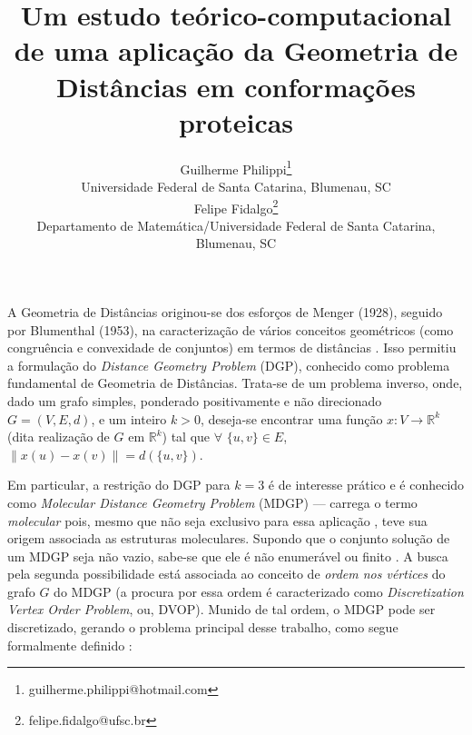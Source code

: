 \documentclass[a4,11pt]{pssbmac}
\begin{document}
	
	\title{Um estudo teórico-computacional de uma aplicação da Geometria de Distâncias em conformações proteicas}
	
	\author{
		{\large Guilherme Philippi}\thanks{guilherme.philippi@hotmail.com}\\
		{\small Universidade Federal de Santa Catarina, Blumenau, SC} \\
		{\large Felipe Fidalgo}\thanks{felipe.fidalgo@ufsc.br} \\
		{\small Departamento de Matemática/Universidade Federal de Santa Catarina, Blumenau, SC} \\
	}
	\criartitulo
	
	A Geometria de Distâncias originou-se dos esforços de Menger (1928), seguido por Blumenthal (1953), na caracterização de vários conceitos geométricos (como congruência e convexidade de conjuntos) em termos de distâncias \cite{carlileGDandAplications}. Isso permitiu a formulação do \textit{Distance Geometry Problem} (DGP), conhecido como problema fundamental de Geometria de Distâncias. Trata-se de um problema inverso, onde, dado um grafo simples, ponderado positivamente e não direcionado $G=(V,E, d)$, e um inteiro $k>0$, deseja-se encontrar uma função $x:V\rightarrow\mathbb{R}^k$ (dita realização de $G$ em $\mathbb{R}^k$) tal que $\forall$ $\{u,v\} \in E$, $\left\|x(u) - x(v)\right\| = d(\{u,v\})$. 
	
	Em particular, a restrição do DGP para $k = 3$ é de interesse prático e é conhecido como \textit{Molecular Distance Geometry Problem} (MDGP) --- carrega o termo \textit{molecular} pois, mesmo que não seja exclusivo para essa aplicação \cite{carlileGDandAplications}, teve sua origem associada as estruturas moleculares. Supondo que o conjunto solução de um MDGP seja não vazio, sabe-se que ele é não enumerável ou finito \cite{carlileBook31Coloquio}. A busca pela segunda possibilidade está associada ao conceito de \textit{ordem nos vértices} do grafo $G$ do MDGP (a procura por essa ordem é caracterizado como \textit{Discretization Vertex Order Problem}, ou, DVOP). Munido de tal ordem, o MDGP pode ser discretizado, gerando o problema principal desse trabalho, como segue formalmente definido \cite{carlileBook31Coloquio}: %
	
\end{document}
